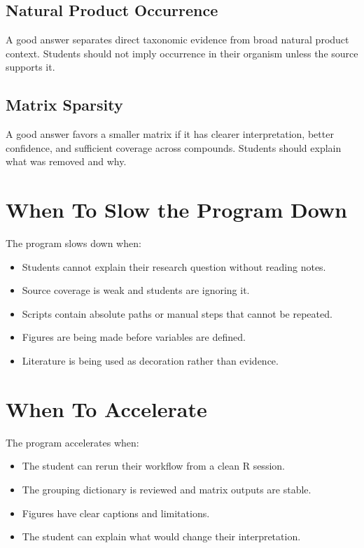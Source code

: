 \subsection{Natural Product Occurrence}
A good answer separates direct taxonomic evidence from broad natural product context. Students should not imply occurrence in their organism unless the source supports it.

\subsection{Matrix Sparsity}
A good answer favors a smaller matrix if it has clearer interpretation, better confidence, and sufficient coverage across compounds. Students should explain what was removed and why.

\section{When To Slow the Program Down}
The program slows down when:
\begin{itemize}
  \item Students cannot explain their research question without reading notes.
  \item Source coverage is weak and students are ignoring it.
  \item Scripts contain absolute paths or manual steps that cannot be repeated.
  \item Figures are being made before variables are defined.
  \item Literature is being used as decoration rather than evidence.
\end{itemize}

\section{When To Accelerate}
The program accelerates when:
\begin{itemize}
  \item The student can rerun their workflow from a clean R session.
  \item The grouping dictionary is reviewed and matrix outputs are stable.
  \item Figures have clear captions and limitations.
  \item The student can explain what would change their interpretation.
\end{itemize}


